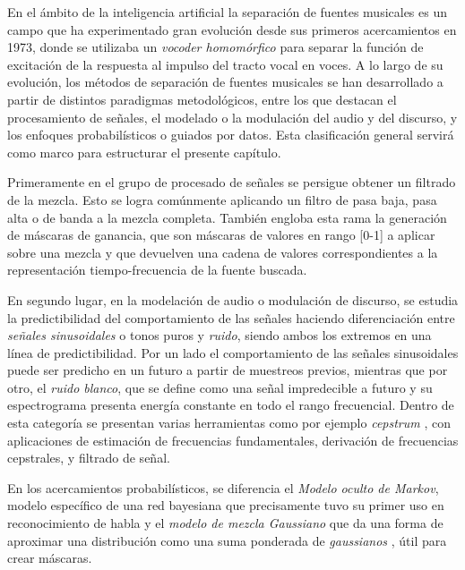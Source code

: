 En el ámbito de la inteligencia artificial la separación de fuentes musicales es un campo que ha experimentado gran evolución desde sus primeros acercamientos en 1973, donde se utilizaba un \textit{vocoder homomórfico}\cite{rafii18} para separar la función de excitación de la respuesta al impulso del tracto vocal en voces. A lo largo de su evolución, los métodos de separación de fuentes musicales se han desarrollado a partir de distintos paradigmas metodológicos, entre los que destacan el procesamiento de señales, el modelado o la modulación del audio y del discurso, y los enfoques probabilísticos o guiados por datos. Esta clasificación general servirá como marco para estructurar el presente capítulo.

Primeramente en el grupo de procesado de señales se persigue obtener un filtrado de la mezcla. Esto se logra comúnmente aplicando un filtro de pasa baja, pasa alta o de banda a la mezcla completa. También engloba esta rama la generación de máscaras de ganancia, que son máscaras de valores en rango [0-1] a aplicar sobre una mezcla y que devuelven una cadena de valores correspondientes a la representación tiempo-frecuencia de la fuente buscada.

En segundo lugar, en la modelación de audio o modulación de discurso, se estudia la predictibilidad del comportamiento de las señales haciendo diferenciación entre \textit{señales sinusoidales} o tonos puros y \textit{ruido}, siendo ambos los extremos en una línea de predictibilidad. Por un lado el comportamiento de las señales sinusoidales puede ser predicho en un futuro a partir de muestreos previos, mientras que por otro, el \textit{ruido blanco}, que se define como una señal impredecible a futuro y su espectrograma presenta energía constante en todo el rango frecuencial. Dentro de esta categoría se presentan varias herramientas como por ejemplo \textit{cepstrum} \cite{cepstrum}, con aplicaciones de estimación de frecuencias fundamentales, derivación de frecuencias cepstrales, y filtrado de señal.

En los acercamientos probabilísticos, se diferencia el \textit{Modelo oculto de Markov}, modelo específico de una red bayesiana que precisamente tuvo su primer uso en reconocimiento de habla \cite{hiddenmarkov} y el \textit{modelo de mezcla Gaussiano} que da una forma de aproximar una distribución como una suma ponderada de \textit{gaussianos} \cite{gaussianMixModels}, útil para crear máscaras.